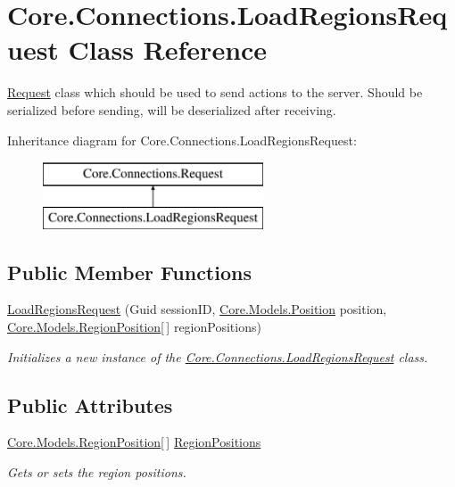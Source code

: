 \hypertarget{classCore_1_1Connections_1_1LoadRegionsRequest}{}\section{Core.\+Connections.\+Load\+Regions\+Request Class Reference}
\label{classCore_1_1Connections_1_1LoadRegionsRequest}


\hyperlink{classCore_1_1Connections_1_1Request}{Request} class which should be used to send actions to the server. Should be serialized before sending, will be deserialized after receiving.  


Inheritance diagram for Core.\+Connections.\+Load\+Regions\+Request\+:\begin{figure}[H]
\begin{center}
\leavevmode
\includegraphics[height=2.000000cm]{classCore_1_1Connections_1_1LoadRegionsRequest}
\end{center}
\end{figure}
\subsection*{Public Member Functions}
\begin{DoxyCompactItemize}
\item 
\hyperlink{classCore_1_1Connections_1_1LoadRegionsRequest_ac0cb2eee50164cbd2449536ecb29956a}{Load\+Regions\+Request} (Guid session\+I\+D, \hyperlink{classCore_1_1Models_1_1Position}{Core.\+Models.\+Position} position, \hyperlink{classCore_1_1Models_1_1RegionPosition}{Core.\+Models.\+Region\+Position}\mbox{[}$\,$\mbox{]} region\+Positions)
\begin{DoxyCompactList}\small\item\em Initializes a new instance of the \hyperlink{classCore_1_1Connections_1_1LoadRegionsRequest}{Core.\+Connections.\+Load\+Regions\+Request} class. \end{DoxyCompactList}\end{DoxyCompactItemize}
\subsection*{Public Attributes}
\begin{DoxyCompactItemize}
\item 
\hyperlink{classCore_1_1Models_1_1RegionPosition}{Core.\+Models.\+Region\+Position}\mbox{[}$\,$\mbox{]} \hyperlink{classCore_1_1Connections_1_1LoadRegionsRequest_a218b8fc9a7dc007031abe6344dc3dc64}{Region\+Positions}
\begin{DoxyCompactList}\small\item\em Gets or sets the region positions. \end{DoxyCompactList}\end{DoxyCompactItemize}


